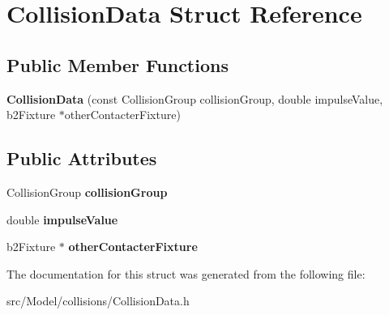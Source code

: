 \hypertarget{structCollisionData}{}\section{Collision\+Data Struct Reference}
\label{structCollisionData}
\subsection*{Public Member Functions}
\begin{DoxyCompactItemize}
\item 
{\bfseries Collision\+Data} (const Collision\+Group collision\+Group, double impulse\+Value, b2\+Fixture $\ast$other\+Contacter\+Fixture)\hypertarget{structCollisionData_a027fba5829b51a5079021c30381f11ca}{}\label{structCollisionData_a027fba5829b51a5079021c30381f11ca}

\end{DoxyCompactItemize}
\subsection*{Public Attributes}
\begin{DoxyCompactItemize}
\item 
Collision\+Group {\bfseries collision\+Group}\hypertarget{structCollisionData_a49804c0a69aa20483f6506c326837472}{}\label{structCollisionData_a49804c0a69aa20483f6506c326837472}

\item 
double {\bfseries impulse\+Value}\hypertarget{structCollisionData_adeb5b92a90ea55f87afa2df1263354cd}{}\label{structCollisionData_adeb5b92a90ea55f87afa2df1263354cd}

\item 
b2\+Fixture $\ast$ {\bfseries other\+Contacter\+Fixture}\hypertarget{structCollisionData_a9a1d6f8a1814eb34a8f16239d189a02f}{}\label{structCollisionData_a9a1d6f8a1814eb34a8f16239d189a02f}

\end{DoxyCompactItemize}


The documentation for this struct was generated from the following file\+:\begin{DoxyCompactItemize}
\item 
src/\+Model/collisions/Collision\+Data.\+h\end{DoxyCompactItemize}
